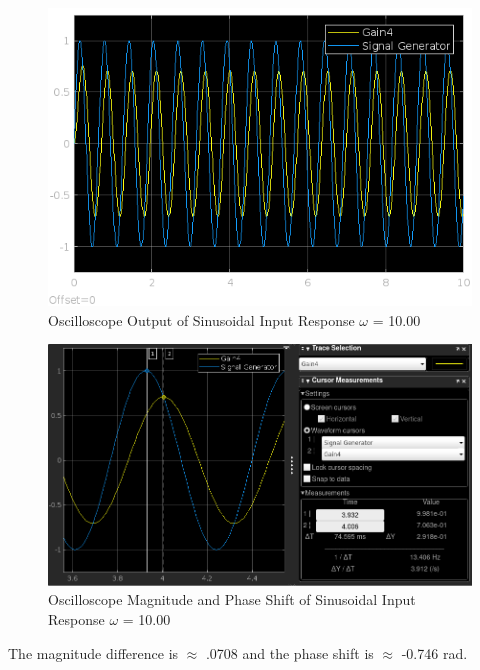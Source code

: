 \documentclass[12pt]{article}
\begin{document}
			\begin{figure}[H]
				\centering
				\includegraphics[width=1\linewidth]{"Code/Fig/sine_input_output_w_10.png"} 
				\caption{Oscilloscope Output of Sinusoidal Input Response $\omega$ = 10.00}
				\label{fig:slx_sine_input_output_w_10}
			\end{figure}
			\begin{figure}[H]
				\centering
				\includegraphics[width=1\linewidth]{"Code/Fig/w_10.png"} 
				\caption{Oscilloscope Magnitude and Phase Shift of Sinusoidal Input Response $\omega$ = 10.00}
				\label{fig:slx_sine_input_output_w_10_diff}
			\end{figure}
			The magnitude difference is $\approx$ .0708 and the phase shift is $\approx$ -0.746 rad.
\end{document}
